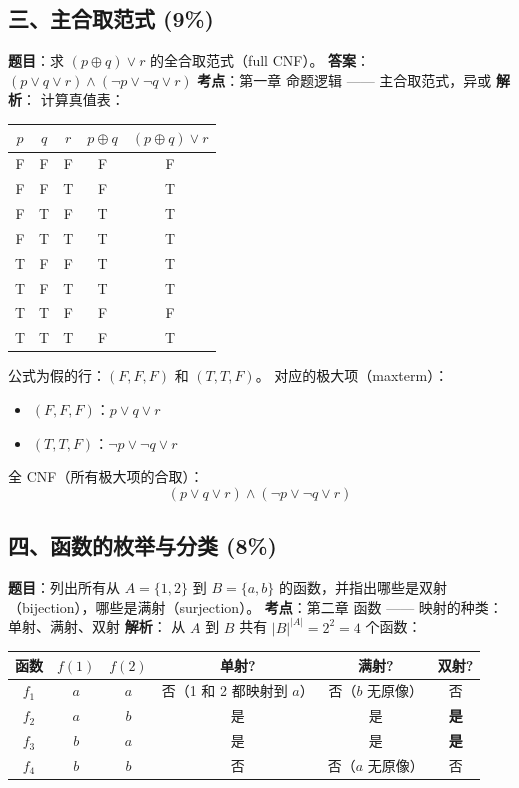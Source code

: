 \documentclass[10pt,a4paper,openany]{ctexbook}
\theoremstyle{definition}
\theoremstyle{remark}
\begin{document}
\vspace{-2pt}

\subsection{三、主合取范式 (9\%)}

\textbf{题目}：求 $(p \oplus q) \lor r$ 的全合取范式（full CNF）。
\textbf{答案}：$(p \lor q \lor r) \land (\neg p \lor \neg q \lor r)$
\textbf{考点}：第一章 命题逻辑 —— 主合取范式，异或
\textbf{解析}：
计算真值表：
\begin{center}
\begin{tabular}{ccccc}
\hline
$p$ & $q$ & $r$ & $p \oplus q$ & $(p \oplus q) \lor r$ \\ \hline
F & F & F & F & F \\
F & F & T & F & T \\
F & T & F & T & T \\
F & T & T & T & T \\
T & F & F & T & T \\
T & F & T & T & T \\
T & T & F & F & F \\
T & T & T & F & T \\
\hline
\end{tabular}

\end{center}

公式为假的行：$(F,F,F)$ 和 $(T,T,F)$。
对应的极大项（maxterm）：
\begin{itemize}
\item $(F,F,F)$：$p \lor q \lor r$
\item $(T,T,F)$：$\neg p \lor \neg q \lor r$

\end{itemize}

全 CNF（所有极大项的合取）：
\[
(p \lor q \lor r) \land (\neg p \lor \neg q \lor r)
\]

\vspace{-2pt}

\subsection{四、函数的枚举与分类 (8\%)}

\textbf{题目}：列出所有从 $A = \{1, 2\}$ 到 $B = \{a, b\}$ 的函数，并指出哪些是双射（bijection），哪些是满射（surjection）。
\textbf{考点}：第二章 函数 —— 映射的种类：单射、满射、双射
\textbf{解析}：
从 $A$ 到 $B$ 共有 $|B|^{|A|} = 2^2 = 4$ 个函数：
\begin{center}
\begin{tabular}{cccccc}
\hline
函数 & $f(1)$ & $f(2)$ & 单射? & 满射? & 双射? \\ \hline
$f_1$ & $a$ & $a$ & 否（1 和 2 都映射到 $a$） & 否（$b$ 无原像） & 否 \\
$f_2$ & $a$ & $b$ & 是 & 是 & \textbf{是} \\
$f_3$ & $b$ & $a$ & 是 & 是 & \textbf{是} \\
$f_4$ & $b$ & $b$ & 否 & 否（$a$ 无原像） & 否 \\
\hline
\end{tabular}

\end{center}
\end{document}

